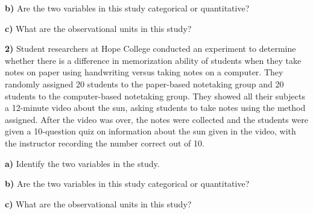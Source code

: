 \documentclass{article}
\newif\ifPrintSolution
\newcommand{\sol}[1]{\ifPrintSolution {\color{blue} #1 } \fi}
\begin{document}
\sol{Interview Method and whether the respondent answered ``yes" or ``no" to the question about weekly exercise.}

\vspace{0.25in}

\hspace{0.1in} \textbf{b) } Are the two variables in this study categorical or quantitative?

\sol{Both are categorical variables.}

\vspace{0.25in}

\hspace{0.1in} \textbf{c) } What are the observational units in this study?

\sol{Each of the 634 survey respondents.}

\vspace{0.35in}

\textbf{2) } \hspace{0.1in} Student researchers at Hope College conducted an experiment to determine whether there is a difference in memorization ability of students when they take notes on paper using handwriting versus taking notes on a computer. They randomly assigned 20 students to the paper-based notetaking group and 20 students to the computer-based notetaking group. They showed all their subjects a 12-minute video about the sun, asking students to take notes using the method assigned. After the video was over, the notes were collected and the students were given a 10-question quiz on information about the sun given in the video, with the instructor recording the number correct out of 10. 

\hspace{0.1in} \textbf{a) } Identify the two variables in the study.

\sol{Whether the student hand-writes notes or types on a computer, and the student's score on a 10 question quiz.}

\vspace{0.25in}

\hspace{0.1in} \textbf{b) } Are the two variables in this study categorical or quantitative?

\sol{Note-taking method is categorical, the students' score is quantitative}

\vspace{0.25in}

\hspace{0.1in} \textbf{c) } What are the observational units in this study?
\end{document}
